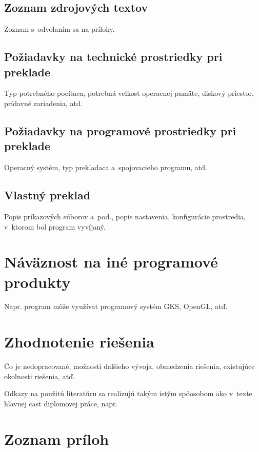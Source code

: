\documentclass[a4paper]{systemovaPrirucka}
\begin{document}
\subsection{Zoznam zdrojových textov}

Zoznam s~odvolaním sa na prílohy.

\subsection{Požiadavky na technické prostriedky pri preklade}

Typ potrebného pocítaca, potrebná velkost operacnej pamäte, diskový priestor, prídavné zariadenia, atd.

\subsection{Požiadavky na programové prostriedky pri preklade}

Operacný systém, typ prekladaca a~spojovacieho programu, atd.

\subsection{Vlastný preklad}

Popis príkazových súborov a~pod., popis  nastavenia, konfigurácie prostredia, v~ktorom bol program vyvíjaný.

\newpage\section{Náväznost na iné programové produkty}

Napr. program môže využívat programový systém GKS, OpenGL, atď.

\newpage\section{Zhodnotenie riešenia}

Čo je nedopracované, možnosti dalšieho vývoja, obmedzenia riešenia, existujúce okolnosti riešenia, atď.


Odkazy na použitú literatúru sa realizujú takým istým spôosobom ako v~texte hlavnej cast diplomovej práce, napr.

\newpage\section{Zoznam príloh}
\end{document}
